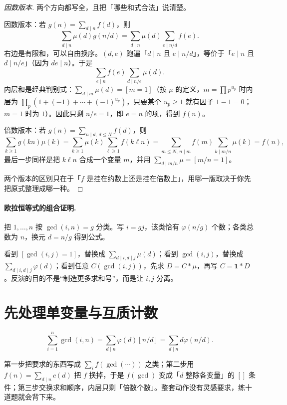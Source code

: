 \documentclass[UTF8,a4paper,11pt,oneside,openany,fontset=fandol]{ctexbook}
\theoremstyle{definition}
\newcommand{\one}{\mathbf 1}
\newcommand{\floor}[1]{\left\lfloor #1\right\rfloor}
\newcommand{\iva}[1]{\left[#1\right]}
\begin{document}
\begin{proof}[因数版本]
两个方向都写全，且把「哪些和式合法」说清楚。

因数版本：若 $g(n)=\sum_{d\mid n}f(d)$，则
\[
 \sum_{d\mid n}\mu(d)g(n/d)
 =\sum_{d\mid n}\mu(d)\sum_{e\mid n/d}f(e).
\]
右边是有限和，可以自由换序。$(d,e)$ 跑遍「$d\mid n$ 且 $e\mid n/d$」，等价于「$e\mid n$ 且 $d\mid n/e$」（因为 $de\mid n$）。于是
\[
 \sum_{e\mid n}f(e)\sum_{d\mid n/e}\mu(d).
\]
内层和是经典判别式：$\sum_{d\mid m}\mu(d)=\iva{m=1}$（按 $\mu$ 的定义，$m=\prod p^{u_p}$ 时内层为 $\prod_p(1+(-1)+\cdots+(-1)^{u_p})$，只要某个 $u_p\ge1$ 就有因子 $1-1=0$；$m=1$ 时为 $1$）。因此只剩 $n/e=1$，即 $e=n$ 的项，得到 $f(n)$。

倍数版本：若 $g(n)=\sum_{n\mid d,\ d\le N}f(d)$，则
\[
 \sum_{k\ge1}g(kn)\mu(k)=\sum_{k\ge1}\mu(k)\sum_{\ell\ge1}f(k\ell n)
 =\sum_{m\le N,\,n\mid m}f(m)\!\!\sum_{k\mid m/n}\!\!\mu(k)=f(n),
\]
最后一步同样是把 $k\ell n$ 合成一个变量 $m$，并用 $\sum_{d\mid m/n}\mu=\iva{m/n=1}$。

两个版本的区别只在于「$f$ 是挂在约数上还是挂在倍数上」，用哪一版取决于你先把原式整理成哪一种。
\end{proof}
\paragraph{欧拉恒等式的组合证明.}
把 $1,\ldots,n$ 按 $\gcd(i,n)=g$ 分类。写 $i=gj$，该类恰有 $\varphi(n/g)$ 个数；各类总数为 $n$，换元 $d=n/g$ 得到公式。
\begin{teach}[怎样想到反演？]
看到 $[\gcd(i,j)=1]$，替换成 $\sum_{d\mid i,d\mid j}\mu(d)$；看到 $\gcd(i,j)$，替换成 $\sum_{d\mid i,d\mid j}\varphi(d)$；看到任意 $C(\gcd(i,j))$，先求 $D=C*\mu$，再写 $C=\one*D$。反演的目的不是“制造更多求和号”，而是让 $i,j$ 分离。
\end{teach}


\section{先处理单变量与互质计数}
\[
 \sum_{i=1}^n\gcd(i,n)
 =\sum_{d\mid n}\varphi(d)\floor{n/d}
 =\sum_{d\mid n}d\varphi(n/d).
\]

\begin{tip}
第一步把要求的东西写成 $\sum_{i}f(\gcd(\cdots))$ 之类；第二步用 $f(n)=\sum_{d\mid n}c(d)$ 把 $f$ 换掉，于是 $f(\gcd)$ 变成「$d$ 整除各变量」的 $\iva{}$ 条件；第三步交换求和顺序，内层只剩「倍数个数」。整套动作没有灵感要求，练十道题就会背下来。
\end{tip}
\end{document}
